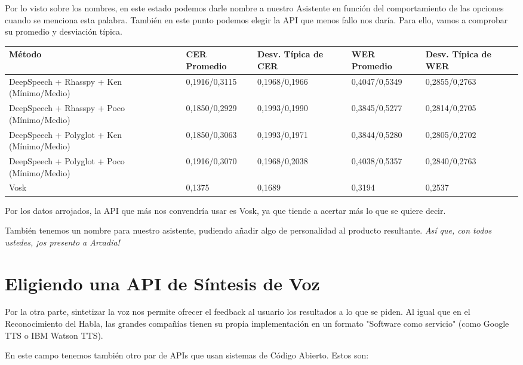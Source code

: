 Por lo visto sobre los nombres, en este estado podemos darle nombre a nuestro Asistente en función del comportamiento de las opciones cuando se menciona esta palabra. También en este punto podemos elegir la API que menos fallo nos daría. Para ello, vamos a comprobar su promedio y desviación típica.

\begin{xltabular}{\textwidth}{|X|X|X|X|X|}
	\hline
	Método & CER Promedio & Desv. Típica de CER & WER Promedio & Desv. Típica de WER \\ \hline
	DeepSpeech + Rhasspy + Ken (Mínimo/Medio) & 0,1916/0,3115 & 0,1968/0,1966 & 0,4047/0,5349 & 0,2855/0,2763 \\ \hline
	DeepSpeech + Rhasspy + Poco (Mínimo/Medio) & 0,1850/0,2929 & 0,1993/0,1990 & 0,3845/0,5277 & 0,2814/0,2705 \\ \hline
	DeepSpeech + Polyglot + Ken (Mínimo/Medio) & 0,1850/0,3063 & 0,1993/0,1971 & 0,3844/0,5280 & 0,2805/0,2702 \\ \hline
	DeepSpeech + Polyglot + Poco (Mínimo/Medio) & 0,1916/0,3070 & 0,1968/0,2038 & 0,4038/0,5357 & 0,2840/0,2763 \\ \hline
	Vosk & 0,1375 & 0,1689 & 0,3194 & 0,2537 \\ \hline
\end{xltabular} 

Por los datos arrojados, la API que más nos convendría usar es Vosk, ya que tiende a acertar más lo que se quiere decir. 

También tenemos un nombre para nuestro asistente, pudiendo añadir algo de personalidad al producto resultante. \textit{Así que, con todos ustedes, ¡os presento a Arcadia!}

\section{Eligiendo una API de Síntesis de Voz}
Por la otra parte, sintetizar la voz nos permite ofrecer el feedback al usuario los resultados a lo que se piden. Al igual que en el Reconocimiento del Habla, las grandes compañías tienen su propia implementación en un formato "Software como servicio" (como Google TTS o IBM Watson TTS).

En este campo tenemos también otro par de APIs que usan sistemas de Código Abierto. Estos son:

